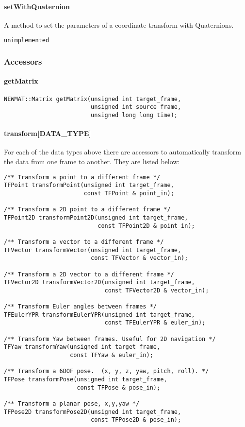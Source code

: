 \documentclass[12pt]{article}
\begin{document}
\paragraph{setWithQuaternion}
A method to set the parameters of a coordinate transform with Quaternions. 
\begin{verbatim}
unimplemented
\end{verbatim}


\subsubsection{Accessors}
\label{libTFAPI accessors}
\paragraph{getMatrix}
\begin{verbatim}
NEWMAT::Matrix getMatrix(unsigned int target_frame,
                         unsigned int source_frame,
                         unsigned long long time); 
\end{verbatim}

\paragraph{transform[DATA\_TYPE]}
For each of the data types above there are accessors to automatically
transform the data from one frame to another. They are listed below:
\begin{verbatim}
/** Transform a point to a different frame */
TFPoint transformPoint(unsigned int target_frame, 
                       const TFPoint & point_in);

/** Transform a 2D point to a different frame */
TFPoint2D transformPoint2D(unsigned int target_frame, 
                           const TFPoint2D & point_in);

/** Transform a vector to a different frame */
TFVector transformVector(unsigned int target_frame, 
                         const TFVector & vector_in);

/** Transform a 2D vector to a different frame */
TFVector2D transformVector2D(unsigned int target_frame, 
                             const TFVector2D & vector_in);

/** Transform Euler angles between frames */
TFEulerYPR transformEulerYPR(unsigned int target_frame, 
                             const TFEulerYPR & euler_in);

/** Transform Yaw between frames. Useful for 2D navigation */
TFYaw transformYaw(unsigned int target_frame, 
                   const TFYaw & euler_in);

/** Transform a 6DOF pose.  (x, y, z, yaw, pitch, roll). */
TFPose transformPose(unsigned int target_frame, 
                     const TFPose & pose_in);

/** Transform a planar pose, x,y,yaw */
TFPose2D transformPose2D(unsigned int target_frame, 
                         const TFPose2D & pose_in);
\end{verbatim}
\end{document}
